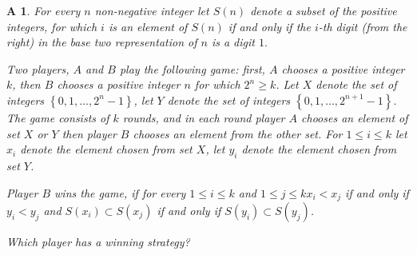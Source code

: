 \documentclass[12pt,a4paper]{scrartcl}
\theoremstyle{wonamestylealt}
\newtheorem{proba}{A}
\begin{document}
	\begin{proba}
		For every $n$ non-negative integer let $S(n)$ denote a subset of the positive integers, for which $i$ is an element of $S(n)$ if and only if the $i$-th digit (from the right) in the base two representation of $n$ is a digit $1 .$

		Two players, $A$ and $B$ play the following game: first, $A$ chooses a positive integer $k$, then $B$ chooses a positive integer $n$ for which $2^{n} \geq k$. Let $X$ denote the set of integers $\left\{0,1, \ldots, 2^{n}-1\right\}$, let $Y$ denote the set of integers $\left\{0,1, \ldots, 2^{n+1}-1\right\} .$ The game consists of $k$ rounds, and in each round player $A$ chooses an element of set $X$ or $Y$ then player $B$ chooses an element from the other set. For $1 \leq i \leq k$ let $x_{i}$ denote the element chosen from set $X$, let $y_{i}$ denote the element chosen from set $Y$.

		Player $B$ wins the game, if for every $1 \leq i \leq k$ and $1 \leq j \leq k x_{i}<x_{j}$ if and only if $y_{i}<y_{j}$ and $S\left(x_{i}\right) \subset S\left(x_{j}\right)$ if and only if $S\left(y_{i}\right) \subset S\left(y_{j}\right)$.

		Which player has a winning strategy?
	\end{proba}
\end{document}
